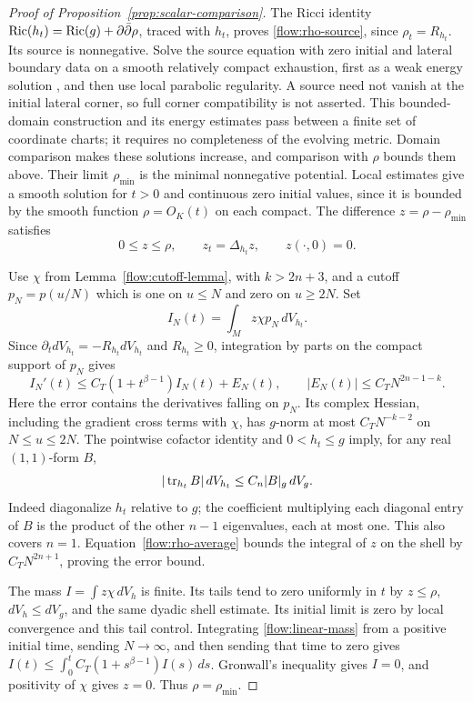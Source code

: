 \begin{proof}[Proof of Proposition~\ref{prop:scalar-comparison}]
The Ricci identity
$\operatorname{Ric}(h_t)=\operatorname{Ric}(g)+\partial\bar\partial\rho$, traced with $h_t$, proves
\eqref{flow:rho-source}, since $\rho_t=R_{h_t}$.
Its source is nonnegative.
Solve the source equation with zero initial and lateral boundary
data on a smooth relatively compact exhaustion, first as a weak
energy solution \cite[Chapter~III, Theorem~4.1]{LSU}, and then use
local parabolic regularity.  A source need not vanish at the
initial lateral corner, so full corner compatibility is not
asserted.  This bounded-domain construction and its energy
estimates pass between a finite set of coordinate charts; it
requires no completeness of the evolving metric.
Domain comparison makes these solutions increase, and
comparison with $\rho$ bounds them above.  Their limit $\rho_{\min}$
is the minimal nonnegative potential.  Local estimates give a smooth
solution for $t>0$ and continuous zero initial values, since it is
bounded by the smooth function $\rho=O_K(t)$ on each compact.
The difference $z=\rho-\rho_{\min}$ satisfies
\[
 0\le z\le\rho,\qquad z_t=\Delta_{h_t}z,
 \qquad z(\cdot,0)=0.
\]

Use $\chi$ from Lemma~\ref{flow:cutoff-lemma}, with $k>2n+3$,
and a cutoff $p_N=p(u/N)$ which is one on $u\le N$ and zero on
$u\ge2N$.  Set
\[
 I_N(t)=\int_M z\chi p_N\,dV_{h_t}.
\]
Since $\partial_tdV_{h_t}=-R_{h_t}dV_{h_t}$ and $R_{h_t}\ge0$,
integration by parts on the compact support of $p_N$ gives
\begin{equation}\label{flow:linear-mass}
 I_N'(t)\le C_T(1+t^{\beta-1})I_N(t)+E_N(t),
 \qquad |E_N(t)|\le C_TN^{2n-1-k}.
\end{equation}
Here the error contains the derivatives falling on $p_N$.  Its
complex Hessian, including the gradient cross terms with $\chi$,
has $g$-norm at most $C_TN^{-k-2}$ on $N\le u\le2N$.
The pointwise cofactor identity and $0<h_t\le g$ imply, for any
real $(1,1)$-form $B$,
\begin{equation}\label{flow:cofactor}
 |\operatorname{tr}_{h_t}B|\,dV_{h_t}
 \le C_n|B|_g\,dV_g.
\end{equation}
Indeed diagonalize $h_t$ relative to $g$; the coefficient multiplying
each diagonal entry of $B$ is the product of the other $n-1$
eigenvalues, each at most one.  This also covers $n=1$.
Equation~\eqref{flow:rho-average} bounds the integral of $z$ on the
shell by $C_TN^{2n+1}$, proving the error bound.

The mass $I=\int z\chi\,dV_h$ is finite.  Its tails tend to zero
uniformly in $t$ by $z\le\rho$, $dV_h\le dV_g$, and the same
dyadic shell estimate.  Its initial limit is zero by local
convergence and this tail control.  Integrating
\eqref{flow:linear-mass} from a positive initial time, sending
$N\to\infty$, and then sending that time to zero gives
$I(t)\le\int_0^tC_T(1+s^{\beta-1})I(s)\,ds$.
Gronwall's inequality gives $I=0$, and positivity of $\chi$ gives
$z=0$.  Thus $\rho=\rho_{\min}$.


\end{proof}
